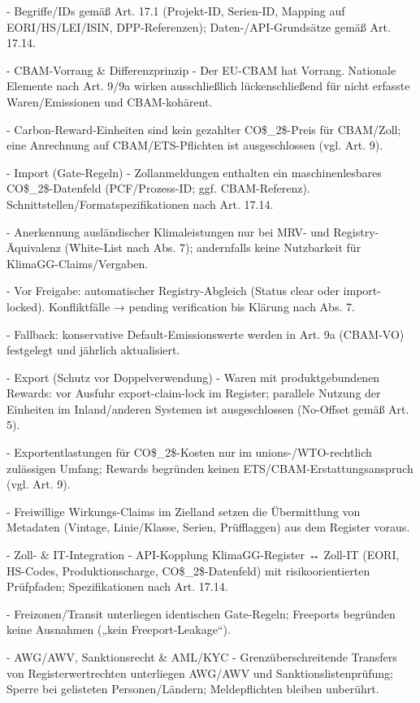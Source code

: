 \documentclass[12pt,a4paper]{scrartcl}
\begin{document}
- Begriffe/IDs gemäß Art. 17.1 (Projekt-ID, Serien-ID, Mapping auf EORI/HS/LEI/ISIN, DPP-Referenzen); Daten-/API-Grundsätze gemäß Art. 17.14.

- CBAM-Vorrang \& Differenzprinzip
- Der EU-CBAM hat Vorrang. Nationale Elemente nach Art. 9/9a wirken ausschließlich lückenschließend für nicht erfasste Waren/Emissionen und CBAM-kohärent.

- Carbon-Reward-Einheiten sind kein gezahlter CO\$\_2\$-Preis für CBAM/Zoll; eine Anrechnung auf CBAM/ETS-Pflichten ist ausgeschlossen (vgl. Art. 9).

- Import (Gate-Regeln)
- Zollanmeldungen enthalten ein maschinenlesbares CO\$\_2\$-Datenfeld (PCF/Prozess-ID; ggf. CBAM-Referenz). Schnittstellen/Formatspezifikationen nach Art. 17.14.

- Anerkennung ausländischer Klimaleistungen nur bei MRV- und Registry-Äquivalenz (White-List nach Abs. 7); andernfalls keine Nutzbarkeit für KlimaGG-Claims/Vergaben.

- Vor Freigabe: automatischer Registry-Abgleich (Status clear oder import-locked). Konfliktfälle → pending verification bis Klärung nach Abs. 7.

- Fallback: konservative Default-Emissionswerte werden in Art. 9a (CBAM-VO) festgelegt und jährlich aktualisiert.

- Export (Schutz vor Doppelverwendung)
- Waren mit produktgebundenen Rewards: vor Ausfuhr export-claim-lock im Register; parallele Nutzung der Einheiten im Inland/anderen Systemen ist ausgeschlossen (No-Offset gemäß Art. 5).

- Exportentlastungen für CO\$\_2\$-Kosten nur im unions-/WTO-rechtlich zulässigen Umfang; Rewards begründen keinen ETS/CBAM-Erstattungsanspruch (vgl. Art. 9).

- Freiwillige Wirkungs-Claims im Zielland setzen die Übermittlung von Metadaten (Vintage, Linie/Klasse, Serien, Prüfflaggen) aus dem Register voraus.

- Zoll- \& IT-Integration
- API-Kopplung KlimaGG-Register ↔ Zoll-IT (EORI, HS-Codes, Produktionscharge, CO\$\_2\$-Datenfeld) mit risikoorientierten Prüfpfaden; Spezifikationen nach Art. 17.14.

- Freizonen/Transit unterliegen identischen Gate-Regeln; Freeports begründen keine Ausnahmen („kein Freeport-Leakage“).

- AWG/AWV, Sanktionsrecht \& AML/KYC
- Grenzüberschreitende Transfers von Registerwertrechten unterliegen AWG/AWV und Sanktionslistenprüfung; Sperre bei gelisteten Personen/Ländern; Meldepflichten bleiben unberührt.
\end{document}
